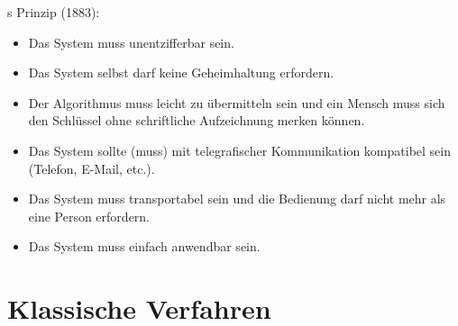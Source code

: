 s Prinzip (1883):
\begin{itemize}
  \item Das System muss unentzifferbar sein.
  \item Das System selbst darf keine Geheimhaltung erfordern.
  \item Der Algorithmus muss leicht zu übermitteln sein und ein Mensch muss sich den Schlüssel ohne schriftliche Aufzeichnung merken können.
  \item Das System sollte (muss) mit telegrafischer Kommunikation kompatibel sein (Telefon, E-Mail, etc.).
  \item Das System muss transportabel sein und die Bedienung darf nicht mehr als eine Person erfordern.
  \item Das System muss einfach anwendbar sein.
\end{itemize}

\section{Klassische Verfahren}

